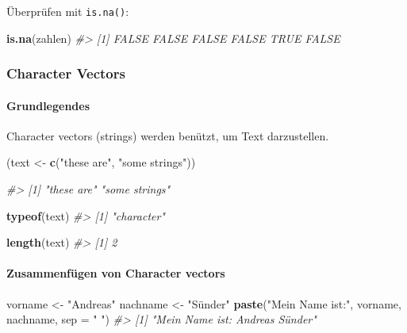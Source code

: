 \documentclass[
]{article}
\newenvironment{Shaded}{\begin{snugshade}}{\end{snugshade}}
\newcommand{\AttributeTok}[1]{\textcolor[rgb]{0.13,0.29,0.53}{#1}}
\newcommand{\CommentTok}[1]{\textcolor[rgb]{0.56,0.35,0.01}{\textit{#1}}}
\newcommand{\FunctionTok}[1]{\textcolor[rgb]{0.13,0.29,0.53}{\textbf{#1}}}
\newcommand{\NormalTok}[1]{#1}
\newcommand{\OtherTok}[1]{\textcolor[rgb]{0.56,0.35,0.01}{#1}}
\newcommand{\StringTok}[1]{\textcolor[rgb]{0.31,0.60,0.02}{#1}}
\begin{document}
Überprüfen mit \texttt{is.na()}:

\begin{Shaded}
\begin{Highlighting}[]
\FunctionTok{is.na}\NormalTok{(zahlen)}
\CommentTok{\#\textgreater{} [1] FALSE FALSE FALSE FALSE  TRUE FALSE}
\end{Highlighting}
\end{Shaded}

\hypertarget{character-vectors}{%
\subsubsection{Character Vectors}\label{character-vectors}}

\hypertarget{grundlegendes-1}{%
\paragraph{Grundlegendes}\label{grundlegendes-1}}

Character vectors (strings) werden benützt, um Text darzustellen.

\begin{Shaded}
\begin{Highlighting}[]
\NormalTok{(text }\OtherTok{\textless{}{-}} \FunctionTok{c}\NormalTok{(}\StringTok{"these are"}\NormalTok{, }\StringTok{"some strings"}\NormalTok{))}

\CommentTok{\#\textgreater{} [1] "these are"    "some strings"}

\FunctionTok{typeof}\NormalTok{(text)}
\CommentTok{\#\textgreater{} [1] "character"}

\FunctionTok{length}\NormalTok{(text)}
\CommentTok{\#\textgreater{} [1] 2}
\end{Highlighting}
\end{Shaded}

\hypertarget{zusammenfuxfcgen-von-character-vectors}{%
\paragraph{Zusammenfügen von Character
vectors}\label{zusammenfuxfcgen-von-character-vectors}}

\begin{Shaded}
\begin{Highlighting}[]
\NormalTok{vorname }\OtherTok{\textless{}{-}} \StringTok{"Andreas"}
\NormalTok{nachname }\OtherTok{\textless{}{-}} \StringTok{"Sünder"}
\FunctionTok{paste}\NormalTok{(}\StringTok{"Mein Name ist:"}\NormalTok{, vorname, nachname, }\AttributeTok{sep =} \StringTok{" "}\NormalTok{)}
\CommentTok{\#\textgreater{} [1] "Mein Name ist: Andreas Sünder"}
\end{Highlighting}
\end{Shaded}
\end{document}
